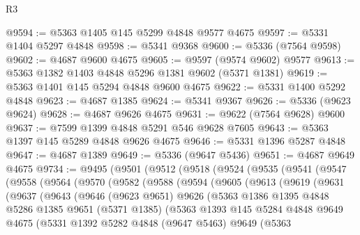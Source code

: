 \begin{lexlean}{R3}
\begin{coremodule}
@9594 := @5363 @1405 @145 @5299 @4848 @9577 @4675
@9597 := @5331 @1404 @5297 @4848
@9598 := @5341 @9368
@9600 := @5336 (@7564 @9598)
@9602 := @4687 @9600 @4675
@9605 := @9597 (@9574 @9602) @9577
@9613 := @5363 @1382 @1403 @4848 @5296 @1381 @9602 (@5371 @1381)
@9619 := @5363 @1401 @145 @5294 @4848 @9600 @4675
@9622 := @5331 @1400 @5292 @4848
@9623 := @4687 @1385
@9624 := @5341 @9367
@9626 := @5336 (@9623 @9624)
@9628 := @4687 @9626 @4675
@9631 := @9622 (@7564 @9628) @9600
@9637 := @7599 @1399 @4848 @5291 @546 @9628 @7605
@9643 := @5363 @1397 @145 @5289 @4848 @9626 @4675
@9646 := @5331 @1396 @5287 @4848
@9647 := @4687 @1389
@9649 := @5336 (@9647 @5436)
@9651 := @4687 @9649 @4675
@9734 := @9495
    (@9501
      (@9512
        (@9518
          (@9524
            (@9535
              (@9541
                (@9547
                  (@9558
                    (@9564
                      (@9570
                        (@9582
                          (@9588
                            (@9594
                              (@9605
                                (@9613
                                  (@9619
                                    (@9631
                                      (@9637
                                        (@9643
                                          (@9646
                                            (@9623 @9651)
                                            @9626
                                            (@5363
                                              @1386
                                              @1395
                                              @4848
                                              @5286
                                              @1385
                                              @9651
                                              (@5371 @1385)
                                              (@5363
                                                @1393
                                                @145
                                                @5284
                                                @4848
                                                @9649
                                                @4675
                                                (@5331
                                                  @1392
                                                  @5282
                                                  @4848
                                                  (@9647 @5463)
                                                  @9649
                                                  (@5363

\end{coremodule}
\end{lexlean}
